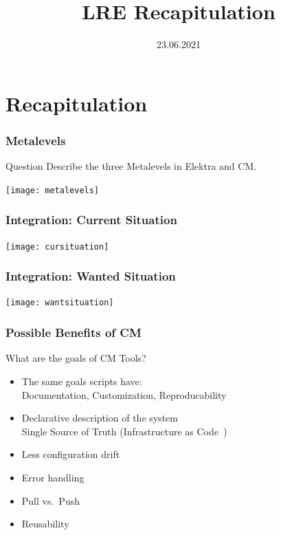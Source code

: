 

\title{LRE Recapitulation}
\date{23.06.2021}




\section{Recapitulation}

\begin{frame}
	\frametitle{Metalevels}
	\begin{alertblock}{Question}
	Describe the three Metalevels in Elektra and CM.
	\end{alertblock}

	\pause
	\texttt{[image: metalevels]}
\end{frame}

\begin{frame}
	\frametitle{Integration: Current Situation}

	\pause
	\texttt{[image: cursituation]}
\end{frame}

\begin{frame}
	\frametitle{Integration: Wanted Situation}

	\pause
	\texttt{[image: wantsituation]}
\end{frame}

\begin{frame}
	\frametitle{Possible Benefits of CM}

	\begin{task}
	What are the goals of CM Tools?
	\end{task}

	\pause

	\begin{itemize} %
	\item The same goals scripts have: \\
		Documentation, Customization, Reproducability
	\item Declarative description of the system \\
		Single Source of Truth 
		(Infrastructure as Code~\cite{waldemar2013testing})
	\item Less configuration drift
	\item Error handling
	\item Pull vs.\ Push
	\item Reusability
	\end{itemize}
\end{frame}

